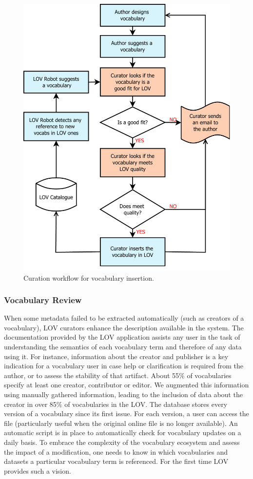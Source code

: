 \documentclass{iosart2c}
\begin{document}
\begin{figure}[ht!b]
\includegraphics[width=1\textwidth]{FlowCharts/DiagramInsert.pdf}
\caption{Curation workflow for vocabulary insertion.}
\label{fig:insertWorkflow}
\end{figure}


	\subsubsection{Vocabulary Review}
When some metadata failed to be extracted automatically (such as creators of a vocabulary), LOV curators enhance the description available in the system. The documentation provided by the LOV application assists any user in the task of understanding the semantics of each vocabulary term and therefore of any data using it. For instance, information about the creator and publisher is a key indication for a vocabulary user in case help or clarification is required from the author, or to assess the stability of that artifact. About 55\% of vocabularies specify at least one creator, contributor or editor. We augmented this information using manually gathered information, leading to the inclusion of data about the creator in over 85\% of vocabularies in the LOV. The database stores every version of a vocabulary since its first issue. For each version, a user can access the file (particularly useful when the original online file is no longer available). An automatic script is in place to automatically check for vocabulary updates on a daily basis. To embrace the complexity of the vocabulary ecosystem and assess the impact of a modification, one needs to know in which vocabularies and datasets a particular vocabulary term is referenced. For the first time LOV provides such a vision. 
\end{document}
